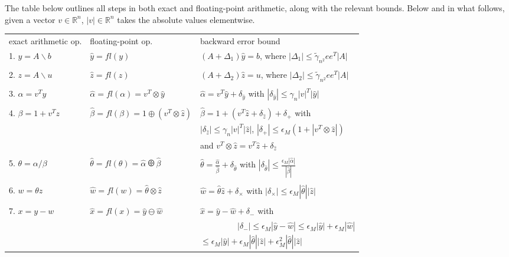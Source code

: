 \documentclass{siamltex}
\newcommand{\eps}{\epsilon}
\begin{document}
The table below outlines all steps in both exact and floating-point arithmetic, along with the relevant bounds. Below and in what follows, given a vector $v\in\mathbb{R}^n$, $|v|\in\mathbb{R}^n$ takes the absolute values elementwise.
\begin{table}[!h]
\begin{tabular}{lll}
exact arithmetic op. & floating-point op. & backward error bound\\
1. $y = A\backslash b$ & $\hat y = fl(y)$ & $(A+\Delta_1) \hat y = b$, where $|\Delta_1| \leq \tilde \gamma_{n^2} e e^T |A|$\\
&  & \\
2. $z = A \backslash u$ & $\hat z = fl(z)$ & $(A+\Delta_2) \hat z = u$, where $|\Delta_2| \leq \tilde \gamma_{n^2} e e^T |A|$\\
&  & \\
3. $\alpha = v^T y$ & $\hat \alpha = fl(\alpha) = v^T \otimes \hat y$ & $\hat \alpha = v^T \hat y + \delta_{\hat y}$ with $|\delta_{\hat y}| \leq \gamma_n |v|^T |\hat y|$\\
&  & \\
4. $\beta = 1 + v^T z$ & $\hat \beta = fl(\beta) = 1 \oplus (v^T \otimes \hat z)$ & $\hat \beta = 1 + (v^T \hat z + \delta_{\hat z}) + \delta_{+}$ with \\
&  & $|\delta_{\hat z}| \leq \gamma_n |v|^T |\hat z|$, $|\delta_{+}| \leq \eps_M (1 + |v^T \otimes \hat z|) $\\
& & and $v^T \otimes \hat z = v^T \hat z + \delta_{\hat z}$\\
&  & \\
5. $\theta = \alpha / \beta$ & $\hat \theta = fl(\theta) =  \hat \alpha \odiv \hat \beta$  & $\hat \theta = \frac{\hat \alpha}{\hat \beta} + \delta_{\hat \theta}$ with 
$|\delta_{\hat \theta}| \leq \frac{\eps_M |\hat \alpha|}{|\hat \beta|} $ \\
&  & \\
6. $w = \theta z$ & $\hat w = fl(w) =  \hat \theta \otimes \hat z$  & $\hat w = \hat \theta \hat z + \delta_{\times}$ with $|\delta_{\times}| \leq \eps_M |\hat \theta| |\hat z|$\\
&  & \\
	                  
7. $x = y - w$ & $\hat x = fl(x) =  \hat y \ominus \hat w$ & $\hat x = \hat y - \hat w + \delta_{-}$ with \\
  		                  & & \ \ \ \  \ \ \ \ \  $|\delta_-| \leq \eps_M |\hat y - \hat w| \leq \eps_M |\hat y| + \eps_M |\hat w|$\\
& & \qquad \qquad \quad $\leq \eps_M |\hat y| + \eps_M |\hat \theta| |\hat z| + \eps_M^2 |\hat \theta| |\hat z|$
\end{tabular}
\end{table}
\end{document}
